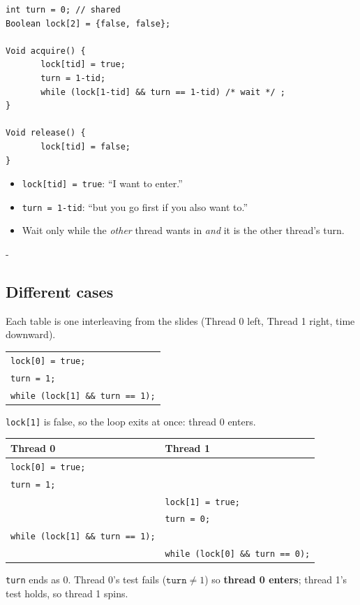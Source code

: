 \documentclass[11pt,a4paper]{article}
\makeatletter
\newcommand{\keepspace}[1]{\par\penalty-100\begingroup
  \setlength{\dimen@}{#1}\dimen@ii\pagegoal\advance\dimen@ii-\pagetotal
  \ifdim\dimen@>\dimen@ii\ifdim\dimen@ii>\z@\vfil\fi\break\fi\endgroup}
\makeatother
\begin{document}
\begin{lstlisting}
int turn = 0; // shared
Boolean lock[2] = {false, false};

Void acquire() {
       lock[tid] = true;
       turn = 1-tid;
       while (lock[1-tid] && turn == 1-tid) /* wait */ ;
}

Void release() {
       lock[tid] = false;
}
\end{lstlisting}

\begin{itemize}
  \item \texttt{lock[tid] = true}: ``I want to enter.''
  \item \texttt{turn = 1-tid}: ``but you go first if you also want to.''
  \item Wait only while the \emph{other} thread wants in \emph{and} it is the
        other thread's turn.
\end{itemize}

\keepspace{14\baselineskip}
\subsection{Different cases}

Each table is one interleaving from the slides (Thread 0 left, Thread 1
right, time downward).

\begin{solbox}
\begin{center}
\begin{tabular}{@{}l@{}}
  \texttt{lock[0] = true;} \\
  \texttt{turn = 1;} \\
  \texttt{while (lock[1] \&\& turn == 1);} \\
\end{tabular}
\end{center}
\texttt{lock[1]} is false, so the loop exits at once: thread 0 enters.
\end{solbox}

\begin{solbox}
\begin{center}
\renewcommand{\arraystretch}{1.08}
\begin{tabular}{@{}ll@{}}
  \toprule
  \textbf{Thread 0} & \textbf{Thread 1} \\
  \midrule
  \texttt{lock[0] = true;} & \\
  \texttt{turn = 1;} & \\
  & \texttt{lock[1] = true;} \\
  & \texttt{turn = 0;} \\
  \texttt{while (lock[1] \&\& turn == 1);} & \\
  & \texttt{while (lock[0] \&\& turn == 0);} \\
  \bottomrule
\end{tabular}
\end{center}
\texttt{turn} ends as 0. Thread 0's test fails (\(\texttt{turn} \neq 1\))
so \textbf{thread 0 enters}; thread 1's test holds, so thread 1 spins.
\end{solbox}
\end{document}
